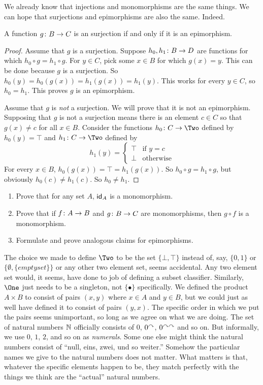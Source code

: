 We already know that injections and monomorphisms are the same things. We can hope that surjections and epimorphisms are also the same. Indeed.

\begin{lemma}
	A function ${g}\colon{B}\to{C}$ is an surjection if and only if it is an epimorphism.
	\begin{proof}
		Assume that $g$ is a surjection. 
		Suppose ${h_0,h_1}\colon{B}\to{D}$ are functions for which $h_0\circ g = h_1\circ g$. 
		For $y\in C$, pick some $x\in B$ for which $g(x)=y$.
		This can be done because $g$ is a surjection.
		So $h_0(y) = h_0(g(x)) = h_1(g(x)) = h_1(y)$.
		This works for every $y\in C$, so $h_0=h_1$.
		This proves $g$ is an epimorphism.
		
		Assume that $g$ is \emph{not} a surjection.
		We will prove that it is not an epimorphism.
		Supposing that $g$ is not a surjection means there is an element $c\in C$ so that $g(x)\neq c$ for all $x\in B$. 
		Consider the functions $\fromto {h_0}C\Two$ defined by $h_0(y)=\top$ and $\fromto {h_1}C\Two$ defined by 
		\[h_1(y) = \begin{cases}
			\top & \text{if  $y=c$}\\
			\bot &\text {otherwise}
		\end{cases}
		\]
		For every $x\in B$, $h_0(g(x)) = \top = h_1(g(x))$. So $h_0\circ g = h_1\circ g$, but obviously $h_0(c)\neq h_1(c)$. So $h_0\neq h_1$.  
	\end{proof}
\end{lemma}

\begin{exercises}
	\begin{enumerate}
		\item Prove that for any set $A$, $\textsf{id}_A$ is a monomorphism.
		\item Prove that if ${f}\colon{A}\to{B}$ and ${g}\colon{B}\to{C}$ are monomorphisms, then $g\circ f$ is a monomorphism.
		\item Formulate and prove analogous claims for epimorphisms.
	\end{enumerate}
\end{exercises}

The choice we made to define $\Two$ to be the set $\{\bot,\top\}$ instead of, say,
$\{0,1\}$ or $\{\emptyset, \{emptyset\}\}$ or any other two element set, seems accidental. 
Any two element set would, it seems, have done to job of defining a subset classifier. 
Similarly, $\One$ just needs to be a singleton, not $\{\bullet\}$ specifically.
We defined the product $A\times B$ to consist of pairs $(x,y)$ where $x\in A$ and $y\in B$, but we could just as well have defined it to consist of pairs $(y,x)$.
The specific order in which we put the pairs seems unimportant, so long as we agree on what we are doing.
The set of natural numbers $\mathbb N$ officially consists of $0$, $0^\curvearrowright$, $0^{\curvearrowright\curvearrowright}$ and so on. But informally, we use $0$, $1$, $2$, and so on as \emph{numerals}. Some one else might think the natural numbers consist of ``null, eins, zwei, und so weiter.'' Somehow the particular names we give to the natural numbers does not matter. What matters is that, whatever the specific elements happen to be, they match perfectly with the things we think are the ``actual'' natural numbers.

